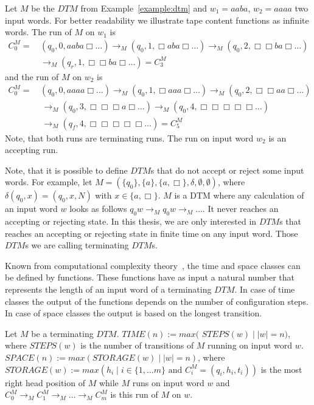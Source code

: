 \begin{example}
    \label{example:run_of_dtm}
    Let $M$ be the $\mathit{DTM}$ from Example~\ref{example:dtm} and $w_1 = aaba$, $w_2 = aaaa$ two input words. For
    better readability we illustrate tape content functions as infinite words. The run of $M$ on $w_1$ is
    \begin{align*}
        C_0^M = &\,(q_0, 0, aaba\Box \dots) \rightarrow_M (q_0, 1, \Box aba\Box \dots) \rightarrow_M  (q_0, 2, \Box \Box
        ba\Box \dots)\\&\, \rightarrow_M (q_r, 1, \Box \Box ba\Box \dots) = C_3^M
    \end{align*}
    and the run of $M$ on $w_2$ is
    \begin{align*}
        C_0^M =\,&(q_0, 0, aaaa\Box \dots) \rightarrow_M (q_0, 1, \Box aaa\Box \dots) \rightarrow_M (q_0, 2, \Box \Box
        aa\Box \dots) \\&\,\rightarrow_M
        (q_0, 3, \Box \Box \Box a\Box \dots) \rightarrow_M (q_0, 4, \Box \Box \Box \Box \Box \dots) \\&\,\rightarrow_M
        (q_f, 4, \Box \Box \Box \Box \Box \dots) = C_5^M
    \end{align*}
    Note, that both runs are terminating runs. The run on input word $w_2$ is an accepting run.
\end{example}

Note, that it is possible to define $\mathit{DTM}$s that do not accept or reject some input words. For example, let
$M = (\{q_0\}, \{a\}, \{a, \Box\}, \delta, \emptyset, \emptyset)$, where $\delta(q_0, x) = (q_0, x, N)$ with $x \in
\{a, \Box\}$. $M$ is a DTM where any calculation of an input word $w$ looks as follows $q_0w \rightarrow_M q_0w
\rightarrow_M \dots$. It never reaches an accepting or rejecting state. In this thesis, we are only interested in
$\mathit{DTM}$s that reaches an accepting or rejecting state in finite time on any input word. Those $\mathit{DTM}$s
we are calling terminating $\mathit{DTM}$s.

Known from computational complexity theory~\cite{papadimitriou1994complexity}, the time and space classes
can be defined by functions. These functions have as input a natural number that represents the length of an input
word of a terminating $\mathit{DTM}$. In case of time classes the output of the functions depends on the number of
configuration steps. In case of space classes the output is based on the longest transition.

\begin{definition}
    Let $M$ be a terminating $\mathit{DTM}$. $\mathit{TIME}(n):= max($ $\mathit{STEPS}(w)\mid |w| = n)$, where
    $\mathit{STEPS}(w)$ is the number of transitions of $M$ running on input word $w$. $\mathit{SPACE}(n) := max
    (\mathit{STORAGE}(w)\mid |w| = n)$, where $\mathit{STORAGE}(w) := max(h_i\mid i\in\{1, \dots m\} \text{ and }
    C_i^M = (q_i, h_i, t_i))$ is the most right head position of $M$ while $M$ runs on input word $w$ and $C_0^M
    \rightarrow_M
    C_1^M \rightarrow_M \dots \rightarrow_M C_m^M$ is this run of $M$ on $w$.
\end{definition}

